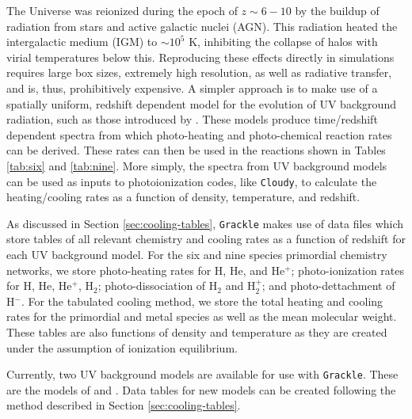 The Universe was reionized during the epoch of $z \sim 6-10$ by the
buildup of radiation from stars and active galactic nuclei (AGN).
This radiation heated the intergalactic medium (IGM) to $\sim10^{5}$
K, inhibiting the collapse of halos with virial temperatures below
this.  Reproducing these effects directly in simulations requires 
large box sizes, extremely high resolution, as well as radiative
transfer, and is, thus, prohibitively expensive.  A simpler approach
is to make use of a spatially uniform, redshift dependent model for
the evolution of UV background radiation, such as those introduced by
\citet{1996ApJ...461...20H}.  These models produce time/redshift
dependent spectra from which photo-heating and photo-chemical reaction
rates can be derived.  These rates can then be used in the reactions
shown in Tables \ref{tab:six} and \ref{tab:nine}.  More simply, the
spectra from UV background models can be used as inputs to
photoionization codes, like \texttt{Cloudy}, to calculate the
heating/cooling rates as a function of density, temperature, and
redshift.

As discussed in Section \ref{sec:cooling-tables}, \texttt{Grackle} makes use of
data files which store tables of all relevant chemistry and cooling
rates as a function of redshift for each UV background model.  For the
six and nine species primordial chemistry networks, we store
photo-heating rates for H, He, and He$^{+}$; photo-ionization rates
for H, He, He$^{+}$, H$_{2}$; photo-dissociation of H$_{2}$ and
H$_{2}^{+}$; and photo-dettachment of H$^{-}$.  For the tabulated
cooling method, we store the total heating and cooling rates for the
primordial and metal species as well as the mean molecular weight.
These tables are also functions of density and temperature as they are
created under the assumption of ionization equilibrium.

Currently, two UV background models are available for use with
\texttt{Grackle}.  These are the models of \citet{2009ApJ...703.1416F} and
\citet{2012ApJ...746..125H}.  Data tables for new models can be
created following the method described in Section
\ref{sec:cooling-tables}.

